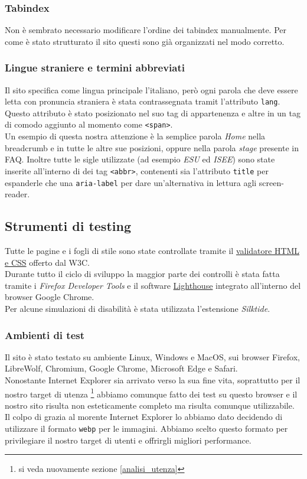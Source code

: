 \subsubsection{Tabindex}
Non è sembrato necessario modificare l'ordine dei tabindex manualmente. Per come è stato strutturato il sito questi sono già organizzati nel modo corretto.

\subsubsection{Lingue straniere e termini abbreviati}
Il sito specifica come lingua principale l'italiano, però ogni parola che deve essere letta con pronuncia straniera è stata contrassegnata tramit l'attributo \texttt{lang}.\\
Questo attributo è stato posizionato nel suo tag di appartenenza e altre in un tag di comodo aggiunto al momento come \texttt{<span>}.\\ 
Un esempio di questa nostra attenzione è la semplice parola \textit{Home} nella breadcrumb e in tutte le altre sue posizioni, oppure nella parola \textit{stage} presente in FAQ. Inoltre tutte le sigle utilizzate (ad esempio \textit{ESU} ed \textit{ISEE}) sono state inserite all'interno di dei tag \texttt{<abbr>}, contenenti sia l'attributo \texttt{title} per espanderle che una \texttt{aria-label} per dare un'alternativa in lettura agli screen-reader.

\subsection{Strumenti di testing}

Tutte le pagine e i fogli di stile sono state controllate tramite il \href{https://validator.w3.org/}{validatore HTML e CSS} offerto dal W3C.\\
Durante tutto il ciclo di sviluppo la maggior parte dei controlli è stata fatta tramite i \textit{Firefox Developer Tools} e il software \href{https://developers.google.com/web/tools/lighthouse}{Lighthouse} integrato all'interno del browser Google Chrome.\\
Per alcune simulazioni di disabilità è stata utilizzata l'estensione \textit{Silktide}.

\subsubsection{Ambienti di test}
Il sito è stato testato su ambiente Linux, Windows e MacOS, sui browser Firefox, LibreWolf, Chromium, Google Chrome, Microsoft Edge e Safari.\\
Nonostante Internet Explorer sia arrivato verso la sua fine vita, soprattutto per il nostro target di utenza \footnote{si veda nuovamente sezione \ref{analisi_utenza}} abbiamo comunque fatto dei test su questo browser e il nostro sito risulta non esteticamente completo ma risulta comunque utilizzabile.\\ 
Il colpo di grazia al morente Internet Explorer lo abbiamo dato decidendo di utilizzare il formato \texttt{webp} per le immagini. Abbiamo scelto questo formato per privilegiare il nostro target di utenti e offrirgli migliori performance.

